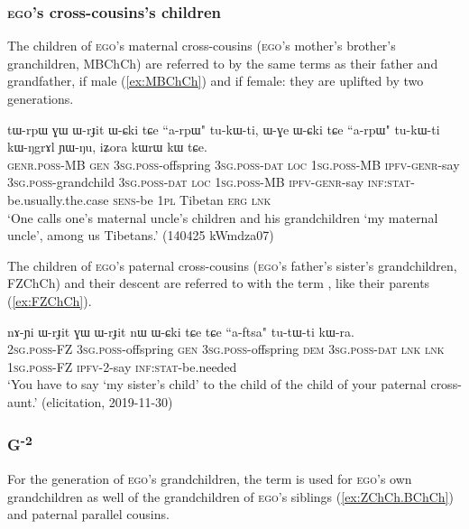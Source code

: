 \subsubsection{\textsc{ego}'s cross-cousins's children} \label{sec:MBCh.FZCh.Ch}
The children of \textsc{ego}'s maternal cross-cousins (\textsc{ego}'s mother's brother's granchildren, MBChCh) are referred to by the same terms as their father and grandfather,  if male (\ref{ex:MBChCh}) and  if female: they are uplifted by two generations.

\begin{exe}
\ex \label{ex:MBChCh}
\gll tɯ-rpɯ ɣɯ ɯ-rɟit ɯ-ɕki tɕe ``a-rpɯ" tu-kɯ-ti, ɯ-ɣe ɯ-ɕki tɕe ``a-rpɯ" tu-kɯ-ti kɯ-ŋgrɤl ɲɯ-ŋu, iʑora kɯrɯ kɯ tɕe. \\
\textsc{genr}.\textsc{poss}-MB \textsc{gen} \textsc{3sg}.\textsc{poss}-offspring \textsc{3sg}.\textsc{poss}-\textsc{dat} \textsc{loc} \textsc{1sg}.\textsc{poss}-MB \textsc{ipfv}-\textsc{genr}-say \textsc{3sg}.\textsc{poss}-grandchild \textsc{3sg}.\textsc{poss}-\textsc{dat} \textsc{loc} \textsc{1sg}.\textsc{poss}-MB \textsc{ipfv}-\textsc{genr}-say  \textsc{inf}:\textsc{stat}-be.usually.the.case \textsc{sens}-be \textsc{1pl} Tibetan \textsc{erg} \textsc{lnk} \\
\glt `One calls one's maternal uncle's children and his grandchildren  `my maternal uncle', among us Tibetans.' (140425 kWmdza07)
\end{exe}

The children of \textsc{ego}'s paternal cross-cousins (\textsc{ego}'s father's sister's grandchildren, FZChCh) and their descent are referred to with the term , like their parents (\ref{ex:FZChCh}).

\begin{exe}
\ex \label{ex:FZChCh}
\gll nɤ-ɲi ɯ-rɟit ɣɯ ɯ-rɟit nɯ ɯ-ɕki tɕe tɕe ``a-ftsa" tu-tɯ-ti kɯ-ra. \\
\textsc{2sg}.\textsc{poss}-FZ \textsc{3sg}.\textsc{poss}-offspring \textsc{gen} \textsc{3sg}.\textsc{poss}-offspring \textsc{dem} \textsc{3sg}.\textsc{poss}-\textsc{dat} \textsc{lnk} \textsc{lnk} \textsc{1sg}.\textsc{poss}-FZ \textsc{ipfv}-2-say \textsc{inf}:\textsc{stat}-be.needed \\
\glt `You have to say  `my sister's child' to the child of the child of your paternal cross-aunt.' (elicitation, 2019-11-30)
\end{exe}


\subsubsection{G\textsuperscript{-2}} \label{sec:G-2}
For the generation of \textsc{ego}'s grandchildren, the term  is used for \textsc{ego}'s own grandchildren as well of the grandchildren of \textsc{ego}'s siblings (\ref{ex:ZChCh.BChCh}) and paternal parallel cousins.

